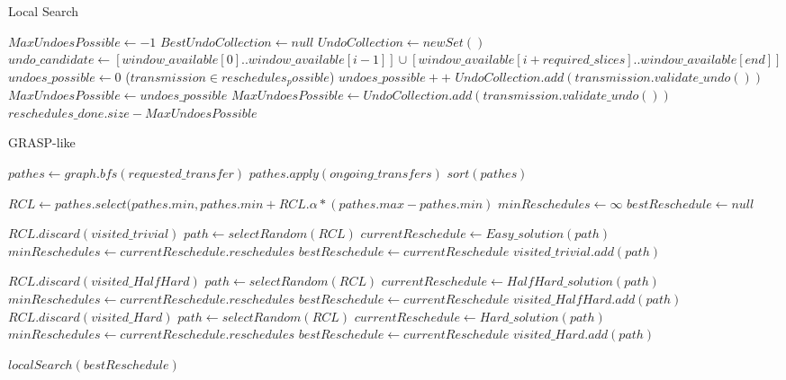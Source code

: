 \documentclass[11pt,a4paper]{article}
\begin{document}
\begin{algorithm}
\caption{Local Search}\label{local_search}
\begin{algorithmic}[1]
	\State $MaxUndoesPossible \gets -1$
	\State $BestUndoCollection \gets null$
		\State $UndoCollection \gets new Set()$
		\State $undo\_candidate \gets [window\_available[0]..window\_available[i-1]] \cup [window\_available[i+required\_slices]..window\_available[end]]$
		\State $undoes\_possible\gets 0$
		\ForAll($transmission \in reschedules_possible$)
				\State $undoes\_possible++$
				\State $UndoCollection.add(transmission.validate\_undo())$
			\EndIf
		\EndFor
			\State $MaxUndoesPossible \gets undoes\_possible$
			\State $MaxUndoesPossible \gets UndoCollection.add		(transmission.validate\_undo())$
		\EndIf
	\EndFor
	\State \Return $reschedules\_done.size - MaxUndoesPossible$

	
\EndProcedure
\end{algorithmic}
\end{algorithm}

\begin{algorithm}
\caption{GRASP-like}\label{grasp}
\begin{algorithmic}[1]
	\State $pathes \gets graph.bfs(requested\_transfer)$
	\State $pathes.apply(ongoing\_transfers)$
	\State $sort(pathes)$

	\State $RCL \gets pathes.select(pathes.min, pathes.min+RCL.\alpha*(pathes.max-pathes.min)$
	\State $minReschedules \gets \infty$
	\State $bestReschedule \gets null$

		\State $RCL.discard(visited\_trivial)$
		\State $path \gets selectRandom(RCL)$
		\State $currentReschedule \gets Easy\_solution(path)$
			\State $minReschedules \gets currentReschedule.reschedules$
			\State $bestReschedule \gets currentReschedule$
		\EndIf
		\State $visited\_trivial.add(path)$
	\EndFor

			\State $RCL.discard(visited\_HalfHard)$
			\State $path \gets selectRandom(RCL)$
			\State $currentReschedule \gets HalfHard\_solution(path)$
				\State $minReschedules \gets currentReschedule.reschedules$
				\State $bestReschedule \gets currentReschedule$
			\EndIf
			\State $visited\_HalfHard.add(path)$
		\EndFor
			\State $RCL.discard(visited\_Hard)$
			\State $path \gets selectRandom(RCL)$
			\State $currentReschedule \gets Hard\_solution(path)$
				\State $minReschedules \gets currentReschedule.reschedules$
				\State $bestReschedule \gets currentReschedule$
			\EndIf
			\State $visited\_Hard.add(path)$
		\EndFor

		\State $localSearch(bestReschedule)$
	\EndIf
\EndProcedure
\end{algorithmic}
\end{algorithm}
\end{document}
